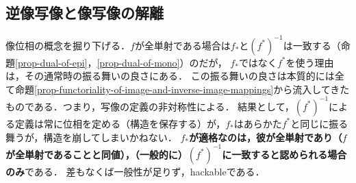 \documentclass[uplatex,dvipdfmx]{jsreport}
\begin{document}
\subsection{逆像写像と像写像の解離}

\begin{tcolorbox}[colframe=ForestGreen, colback=ForestGreen!10!white, breakable]
    像位相の概念を掘り下げる．$f$が全単射である場合は$f_*$と$(f^*)^{-1}$は一致する（命題\ref{prop-dual-of-epi}，\ref{prop-dual-of-mono}）のだが，
    $f_*$ではなく$f^*$を使う理由は，その通常時の振る舞いの良さにある．
    この振る舞いの良さは本質的には全て命題\ref{prop-functoriality-of-image-and-inverse-image-mappings}から流入してきたものである．つまり，写像の定義の非対称性による．
    結果として，$(f^*)^{-1}$による定義は常に位相を定める（構造を保存する）が，$f_*$はあらかた$f^*$と同じに振る舞うが，構造を崩してしまいかねない．
    \textbf{$f_*$が適格なのは，彼が全単射であり（$f$が全単射であることと同値），（一般的に）$(f^*)^{-1}$に一致すると認められる場合のみ}である．
    差もなくば一般性が足りず，hackableである．
\end{tcolorbox}
\end{document}
